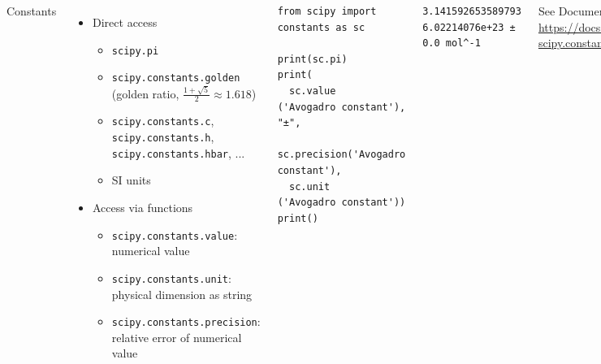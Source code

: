 \begin{frame}[fragile]
%
\begin{columns}[T]
\begin{Large}
	{Constants}
	\vspace{6pt}
\end{Large}
%
\begin{itemize}
\item Direct access
	\begin{itemize}
	\item \texttt{scipy.pi}
	\item \texttt{scipy.constants.golden}\\
	 (golden ratio, $\frac{1 + \sqrt{5}}{2} \approx 1.618$)
	\item \texttt{scipy.constants.c}, \texttt{scipy.constants.h}, \texttt{scipy.constants.hbar}, ...
	\item SI units
	\end{itemize}
\item Access via functions
	\begin{itemize}
	\item \texttt{scipy.constants.value}: numerical value
	\item \texttt{scipy.constants.unit}: physical dimension as string
	\item \texttt{scipy.constants.precision}: relative error of numerical value
	\end{itemize}
\end{itemize}
%
\begin{codebox}
\begin{verbatim}
from scipy import constants as sc

print(sc.pi)
print(
  sc.value    ('Avogadro constant'), "±",
  sc.precision('Avogadro constant'),
  sc.unit     ('Avogadro constant'))
print()
\end{verbatim}
\end{codebox}
%
\begin{cmdbox}
\begin{verbatim}
3.141592653589793
6.02214076e+23 ± 0.0 mol^-1
\end{verbatim}
\end{cmdbox}
%
See Documentation\\
	\scriptsize \url{https://docs.scipy.org/doc/scipy/reference/constants.html#module-scipy.constants}
\end{columns}
%
\end{frame}

